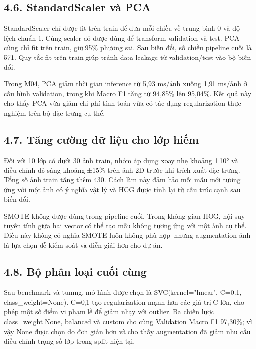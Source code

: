 \documentclass[12pt,a4paper]{article}
\begin{document}
\subsection{4.6. StandardScaler và PCA}\label{standardscaler-vuxe0-pca}

StandardScaler chỉ được fit trên train để đưa mỗi chiều về trung bình 0
và độ lệch chuẩn 1. Cùng scaler đó được dùng để transform validation và
test. PCA cũng chỉ fit trên train, giữ 95\% phương sai. Sau biến đổi, số
chiều pipeline cuối là 571. Quy tắc fit trên train giúp tránh data
leakage từ validation/test vào bộ biến đổi.

Trong M04, PCA giảm thời gian inference từ 5,93 ms/ảnh xuống 1,91 ms/ảnh
ở cấu hình validation, trong khi Macro F1 tăng từ 94,85\% lên 95,04\%.
Kết quả này cho thấy PCA vừa giảm chi phí tính toán vừa có tác dụng
regularization thực nghiệm trên bộ đặc trưng cụ thể.

\subsection{4.7. Tăng cường dữ liệu cho lớp
hiếm}\label{tux103ng-cux1b0ux1eddng-dux1eef-liux1ec7u-cho-lux1edbp-hiux1ebfm}

Đối với 10 lớp có dưới 30 ảnh train, nhóm áp dụng xoay nhẹ khoảng ±10°
và điều chỉnh độ sáng khoảng ±15\% trên ảnh 2D trước khi trích xuất đặc
trưng. Tổng số ảnh train tăng thêm 430. Cách làm này đảm bảo mỗi mẫu mới
tương ứng với một ảnh có ý nghĩa vật lý và HOG được tính lại từ cấu trúc
cạnh sau biến đổi.

SMOTE không được dùng trong pipeline cuối. Trong không gian HOG, nội suy
tuyến tính giữa hai vector có thể tạo mẫu không tương ứng với một ảnh cụ
thể. Điều này không có nghĩa SMOTE luôn không phù hợp, nhưng
augmentation ảnh là lựa chọn dễ kiểm soát và diễn giải hơn cho dự án.

\subsection{4.8. Bộ phân loại cuối
cùng}\label{bux1ed9-phuxe2n-loux1ea1i-cuux1ed1i-cuxf9ng}

Sau benchmark và tuning, mô hình được chọn là SVC(kernel="linear",
C=0.1, class\_weight=None). C=0,1 tạo regularization mạnh hơn các giá
trị C lớn, cho phép một số điểm vi phạm lề để giảm nhạy với outlier. Ba
chiến lược class\_weight None, balanced và custom cho cùng Validation
Macro F1 97,30\%; vì vậy None được chọn do đơn giản hơn và cho thấy
augmentation đã giảm nhu cầu điều chỉnh trọng số lớp trong split hiện
tại.
\end{document}
